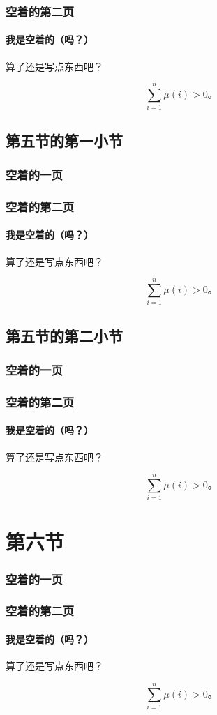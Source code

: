 \documentclass{../pkslide}
\begin{document}
\begin{frame}
  \frametitle{空着的第二页}
  \framesubtitle{我是空着的（吗？）}
  
  算了还是写点东西吧？
  
  \[ \sum_{i = 1}^{n} \mu(i) > 0 \text{。} \]
\end{frame}

\subsection{第五节的第一小节}

\begin{frame}
  \frametitle{空着的一页}
\end{frame}

\begin{frame}
  \frametitle{空着的第二页}
  \framesubtitle{我是空着的（吗？）}
  
  算了还是写点东西吧？
  
  \[ \sum_{i = 1}^{n} \mu(i) > 0 \text{。} \]
\end{frame}

\subsection{第五节的第二小节}

\begin{frame}
  \frametitle{空着的一页}
\end{frame}

\begin{frame}
  \frametitle{空着的第二页}
  \framesubtitle{我是空着的（吗？）}
  
  算了还是写点东西吧？
  
  \[ \sum_{i = 1}^{n} \mu(i) > 0 \text{。} \]
\end{frame}

\section{第六节}

\begin{frame}
  \frametitle{空着的一页}
\end{frame}

\begin{frame}
  \frametitle{空着的第二页}
  \framesubtitle{我是空着的（吗？）}
  
  算了还是写点东西吧？
  
  \[ \sum_{i = 1}^{n} \mu(i) > 0 \text{。} \]
\end{frame}
\end{document}
